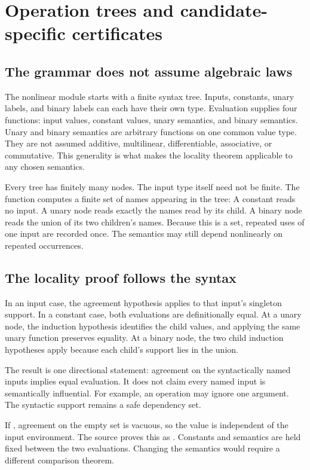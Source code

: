 \clearpage
\section{Operation trees and candidate-specific certificates}
\subsection{The grammar does not assume algebraic laws}
The nonlinear module starts with a finite syntax tree. Inputs, constants, unary labels, and binary labels can each have their own type.
Evaluation supplies four functions: input values, constant values, unary semantics, and binary semantics. Unary and binary semantics are arbitrary functions on one common value type. They are not assumed additive, multilinear, differentiable, associative, or commutative. This generality is what makes the locality theorem applicable to any chosen semantics.

Every tree has finitely many nodes. The input type itself need not be finite. The function  computes a finite set of names appearing in the tree:
A constant reads no input. A unary node reads exactly the names read by its child. A binary node reads the union of its two children's names. Because this is a set, repeated uses of one input are recorded once. The semantics may still depend nonlinearly on repeated occurrences.

\subsection{The locality proof follows the syntax}
In an input case, the agreement hypothesis applies to that input's singleton support. In a constant case, both evaluations are definitionally equal. At a unary node, the induction hypothesis identifies the child values, and applying the same unary function preserves equality. At a binary node, the two child induction hypotheses apply because each child's support lies in the union.

The result is one directional statement: agreement on the syntactically named inputs implies equal evaluation. It does not claim every named input is semantically influential. For example, an operation may ignore one argument. The syntactic support remains a safe dependency set.

If , agreement on the empty set is vacuous, so the value is independent of the input environment. The source proves this as . Constants and semantics are held fixed between the two evaluations. Changing the semantics would require a different comparison theorem.

